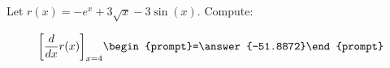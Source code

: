 \documentclass{ximera}
\author{Bart Snapp}
\begin{document}
\begin{exercise}

Let $r(x) = -e^x+3 \sqrt{x}-3 \sin (x)$. Compute:

\[
\eval{\dd{x}r(x)}_{x=4}
\begin{prompt}=\answer{-51.8872}\end{prompt}
\]
\end{exercise}
\end{document}
